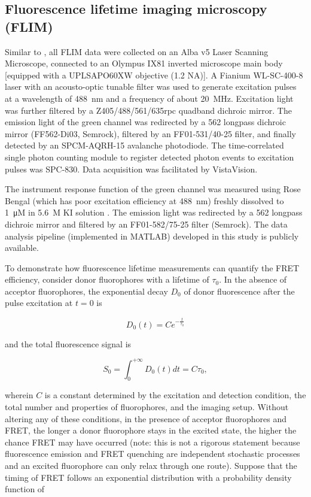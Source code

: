 \subsection{Fluorescence lifetime imaging microscopy (FLIM)}
\label{FLIMMethod}

Similar to , all FLIM data were collected on an Alba v5 Laser Scanning Microscope, connected to an Olympus IX81 inverted microscope main body [equipped with a UPLSAPO60XW objective (1.2 NA)]. A Fianium WL-SC-400-8 laser with an acousto-optic tunable filter was used to generate excitation pulses at a wavelength of \SI{488}{nm} and a frequency of about \SI{20}{MHz}. Excitation light was further filtered by a Z405/488/561/635rpc quadband dichroic mirror. The emission light of the green channel was redirected by a 562 longpass dichroic mirror (FF562-Di03, Semrock), filtered by an FF01-531/40-25 filter, and finally detected by an SPCM-AQRH-15 avalanche photodiode. The time-correlated single photon counting module to register detected photon events to excitation pulses was SPC-830. Data acquisition was facilitated by VistaVision.

The instrument response function of the green channel was measured using Rose Bengal (which has poor excitation efficiency at \SI{488}{nm}) freshly dissolved to \SI{1}{\micro M} in \SI{5.6}{M} KI solution \cite{RoseBengal}. The emission light was redirected by a 562 longpass dichroic mirror and filtered by an FF01-582/75-25 filter (Semrock). The data analysis pipeline (implemented in MATLAB) developed in this study is publicly available.

To demonstrate how fluorescence lifetime measurements can quantify the FRET efficiency, consider donor fluorophores with a lifetime of $\tau_0$. In the absence of acceptor fluorophores, the exponential decay $D_0$ of donor fluorescence after the pulse excitation at $t = 0$ is

\begin{equation*}
    D_0(t) = C e^{-\frac{t}{\tau_0}}
\end{equation*}

\noindent and the total fluorescence signal is

\begin{equation*}
    S_0 = \int_0^{+\infty}D_0(t) dt = C\tau_0,
\end{equation*}

\noindent wherein $C$ is a constant determined by the excitation and detection condition, the total number and properties of fluorophores, and the imaging setup. Without altering any of these conditions, in the presence of acceptor fluorophores and FRET, the longer a donor fluorophore stays in the excited state, the higher the chance FRET may have occurred (note: this is not a rigorous statement because fluorescence emission and FRET quenching are independent stochastic processes and an excited fluorophore can only relax through one route). Suppose that the timing of FRET follows an exponential distribution with a probability density function of

